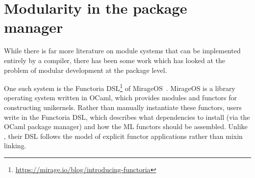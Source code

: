 


\section{Modularity in the package manager}

While there is far more
literature on module systems that can be implemented entirely by a
compiler, there has been some work which has looked at the problem of
modular development at the package level.

One such system
is the Functoria DSL\footnote{\smaller\url{https://mirage.io/blog/introducing-functoria}}
of MirageOS~\cite{mirageos}.  MirageOS is a library operating system
written in OCaml, which provides modules and functors for constructing
unikernels.  Rather than manually instantiate these functors,
users write in the Functoria DSL, which describes what
dependencies to install (via the OCaml package manager) and how the ML
functors should be assembled.  Unlike \Backpack{}, their DSL follows
the model of explicit functor applications rather than mixin linking.

